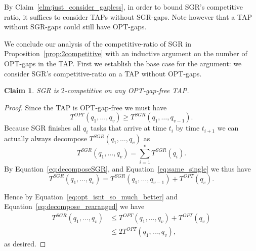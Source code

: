 \documentclass[twocolumn]{article}[10pt]
\newtheorem{claim}{Claim}
\begin{document}
By Claim~\ref{clm:just_consider_gapless}, in order to bound SGR's
competitive ratio, it suffices to consider TAPs
without SGR-gaps. Note however that a TAP without
SGR-gaps could still have OPT-gaps.

We conclude our analysis of the competitive-ratio of SGR in
Proposition~\ref{prop:2competitive} with an inductive argument on
the number of OPT-gaps in the TAP.
First we establish the base case for the argument: we consider
SGR's competitive-ratio on a TAP without OPT-gaps.  

\begin{claim}
  \label{clm:no_optgaps}
  SGR is $2$-competitive on any OPT-gap-free TAP.
\end{claim}
\begin{proof}
  Since the TAP is OPT-gap-free we must have
  \begin{equation}
    \label{eq:opt_isnt_so_much_better}
    T^{OPT}(q_1, \ldots, q_{v}) \ge T^{SGR}(q_1, \ldots, q_{v-1}).
  \end{equation}
  Because SGR finishes all $q_{i}$ tasks that arrive at time $t_i$
  by time $t_{i+1}$ we can actually always decompose
  $T^{SGR}(q_1, \ldots, q_v)$ as 
  \begin{equation}
    \label{eq:decomposeSGR}
    T^{SGR}(q_1, \ldots, q_v) = \sum_{i=1}^v T^{SGR}(q_i).
  \end{equation}
  By Equation~\eqref{eq:decomposeSGR}, and
  Equation~\eqref{eq:same_single} we thus have 
  \begin{equation}
    \label{eq:decompose_rearanged}
    T^{SGR}(q_1, \ldots, q_v) = T^{SGR}(q_1, \ldots, q_{v-1}) + T^{OPT}(q_v) . 
  \end{equation}

  Hence by Equation~\eqref{eq:opt_isnt_so_much_better} and
  Equation~\eqref{eq:decompose_rearanged} we have
  \begin{align*}
    T^{SGR}(q_1, \ldots, q_v) &\le T^{OPT}(q_1, \ldots, q_v) + T^{OPT}(q_v)\\
                                   &\le 2T^{OPT}(q_1, \ldots, q_v),
  \end{align*}
  as desired.
\end{proof}
\end{document}
